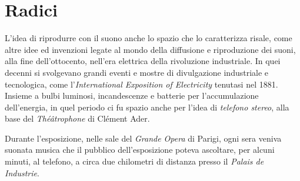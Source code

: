 \section{Radici}

L'idea di riprodurre con il suono anche lo spazio che lo caratterizza risale,
come altre idee ed invenzioni legate al mondo della diffusione e riproduzione
dei suoni, alla fine dell'ottocento, nell'era elettrica della rivoluzione
industriale. In quei decenni si svolgevano grandi eventi e mostre di divulgazione
industriale e tecnologica,
come l'\emph{International Exposition of Electricity} tenutasi nel 1881.
Insieme a bulbi luminosi, incandescenze e batterie per l'accumulazione
dell'energia, in quel periodo ci fu spazio anche per l'idea di \emph{telefono stereo},
alla base del \emph{Théâtrophone} di Clément Ader.

Durante l'esposizione, nelle sale del \emph{Grande Opera} di Parigi, ogni sera
veniva suonata musica che il pubblico dell'esposizione poteva ascoltare, per alcuni minuti, al telefono,
a circa due chilometri di distanza presso il \emph{Palais de Industrie}.


